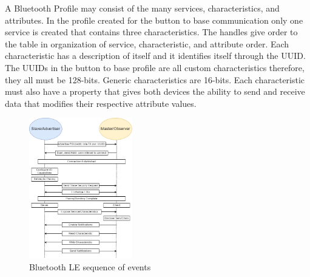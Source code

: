 \documentclass[journal,compsoc]{IEEEtran}
\begin{document}
A Bluetooth Profile may consist of the many services, characteristics, and attributes. In the profile created for the button to base communication only one service is created that contains three characteristics.  The handles give order to the table in organization of service, characteristic, and attribute order. Each characteristic has a description of itself and it identifies itself through the UUID. The UUIDs in the button to base profile are all custom characteristics therefore, they all must be 128-bits.  Generic characteristics are 16-bits. Each characteristic must also have a property that gives both devices the ability to send and receive data that modifies their respective attribute values.
\begin{figure}[H] 	%
\centering
\includegraphics[width=0.4\textwidth]{Bluetooth.png}
\caption{ \space Bluetooth LE sequence of events}
\label{ble}
\end{figure}
\end{document}
